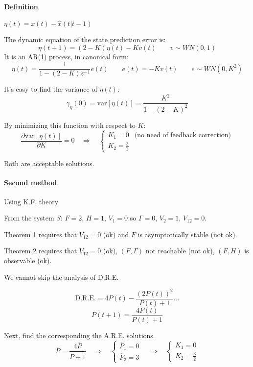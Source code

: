 \paragraph{Definition} $\eta(t) = x(t) - \hat{x}(t|t-1)$

The dynamic equation of the state prediction error is:
\[
    \eta(t+1) = (2-K)\eta(t) - Kv(t) \qquad v \sim WN(0,1)
\]
It is an AR(1) process, in canonical form:
\[
    \eta(t) = \frac{1}{1-(2-K)z^{-1}}e(t) \qquad e(t) = -Kv(t) \qquad e \sim WN(0, K^2)
\]

It's easy to find the variance of $\eta(t)$:
\[
    \gamma_\eta(0) = \text{var}\left[\eta(t)\right] = \frac{K^2}{1-(2-K)^2}
\]

By minimizing this function with respect to $K$:
\[
    \frac{\partial \text{var} \left[\eta(t)\right]}{\partial K} = 0 \quad\Rightarrow\quad \begin{cases}
        K_1 = 0 & \text{(no need of feedback correction)} \\
        K_2 = \frac{3}{2}
    \end{cases}
\]

Both are acceptable solutions.

\paragraph{Second method} Using K.F. theory

From the system $S$: $F=2$, $H=1$, $V_1 = 0$ so $\Gamma = 0$, $V_2 = 1$, $V_{12} = 0$.

Theorem 1 requires that $V_{12} = 0$ (ok) and $F$ is asymptotically stable (not ok).

Theorem 2 requires that $V_{12} = 0$ (ok), $(F, \Gamma)$ not reachable (not ok), $(F, H)$ is observable (ok).

We cannot skip the analysis of D.R.E.

\[
    \text{D.R.E.} = 4P(t) - \frac{(2P(t))^2}{P(t)+1} \ldots
\]
\[
    P(t+1) = \frac{4P(t)}{P(t) + 1}
\]

Next, find the corresponding the A.R.E. solutions.
\[
    \overline{P} = \frac{4\overline{P}}{\overline{P}+1} \quad\Rightarrow\quad \begin{cases}
        \overline{P}_1 = 0 \\
        \overline{P}_2 = 3
    \end{cases}
    \quad\Rightarrow\quad \begin{cases}
        K_1 = 0 \\
        K_2 = \frac{3}{2}
    \end{cases}
\]

